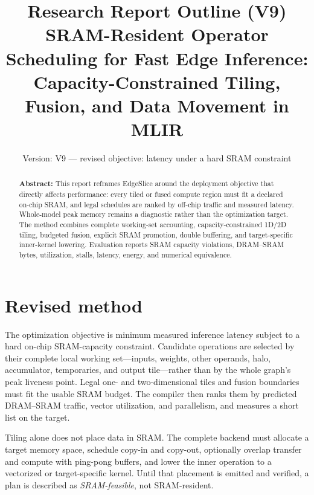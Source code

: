 \documentclass[12pt,a4paper]{article}
\title{\textbf{Research Report Outline (V9)}\\
\large SRAM-Resident Operator Scheduling for Fast Edge Inference:\\
Capacity-Constrained Tiling, Fusion, and Data Movement in MLIR}
\date{Version: V9 --- revised objective: latency under a hard SRAM constraint}
\begin{document}
\maketitle

\begin{abstract}
\textbf{Abstract:} This report reframes EdgeSlice around the deployment
objective that directly affects performance: every tiled or fused compute
region must fit a declared on-chip SRAM, and legal schedules are ranked by
off-chip traffic and measured latency. Whole-model peak memory remains a
diagnostic rather than the optimization target. The method combines complete
working-set accounting, capacity-constrained 1D/2D tiling, budgeted fusion,
explicit SRAM promotion, double buffering, and target-specific inner-kernel
lowering. Evaluation reports SRAM capacity violations, DRAM--SRAM bytes,
utilization, stalls, latency, energy, and numerical equivalence.
\end{abstract}

\section*{Revised method}
The optimization objective is minimum measured inference latency subject to a
hard on-chip SRAM-capacity constraint. Candidate operations are selected by
their complete local working set---inputs, weights, other operands, halo,
accumulator, temporaries, and output tile---rather than by the whole graph's
peak liveness point. Legal one- and two-dimensional tiles and fusion boundaries
must fit the usable SRAM budget. The compiler then ranks them by predicted
DRAM--SRAM traffic, vector utilization, and parallelism, and measures a short
list on the target.

Tiling alone does not place data in SRAM. The complete backend must allocate a
target memory space, schedule copy-in and copy-out, optionally overlap transfer
and compute with ping-pong buffers, and lower the inner operation to a
vectorized or target-specific kernel. Until that placement is emitted and
verified, a plan is described as \emph{SRAM-feasible}, not SRAM-resident.
\end{document}
